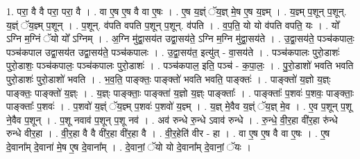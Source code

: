 \documentclass[17pt]{extarticle}
\begin{document}
1. परा॒ वै वै परा॒ परा॒ वै । . वा ए॒ष ए॒ष वै वा ए॒षः । . ए॒ष य॒ज्ञ्ं ॅय॒ज्ञ् मे॒ष ए॒ष य॒ज्ञ्म् । . य॒ज्ञ्म् प॒शून् प॒शून्. य॒ज्ञ्ं ॅय॒ज्ञ्म् प॒शून् । . प॒शून्. व॑पति वपति प॒शून् प॒शून्. व॑पति । . व॒प॒ति॒ यो यो व॑पति वपति॒ यः । . यो᳚ ऽग्नि म॒ग्निं ॅयो यो᳚ ऽग्निम् । . अ॒ग्नि मु॑द्वा॒सय॑त उद्वा॒सय॑ते॒ ऽग्नि म॒ग्नि मु॑द्वा॒सय॑ते । . उ॒द्वा॒सय॑ते॒ पञ्च॑कपालः॒ पञ्च॑कपाल उद्वा॒सय॑त उद्वा॒सय॑ते॒ पञ्च॑कपालः । . उ॒द्वा॒सय॑त॒ इत्यु॑त् - वा॒सय॑ते । . पञ्च॑कपालः पुरो॒डाशः॑ पुरो॒डाशः॒ पञ्च॑कपालः॒ पञ्च॑कपालः पुरो॒डाशः॑ । . पञ्च॑कपाल॒ इति॒ पञ्च॑ - क॒पा॒लः॒ । . पु॒रो॒डाशो॑ भवति भवति पुरो॒डाशः॑ पुरो॒डाशो॑ भवति । . भ॒व॒ति॒ पाङ्क्तः॒ पाङ्क्तो॑ भवति भवति॒ पाङ्क्तः॑ । . पाङ्क्तो॑ य॒ज्ञो य॒ज्ञ्ः पाङ्क्तः॒ पाङ्क्तो॑ य॒ज्ञ्ः । . य॒ज्ञ्ः पाङ्क्ताः॒ पाङ्क्ता॑ य॒ज्ञो य॒ज्ञ्ः पाङ्क्ताः᳚ । . पाङ्क्ताः᳚ प॒शवः॑ प॒शवः॒ पाङ्क्ताः॒ पाङ्क्ताः᳚ प॒शवः॑ । . प॒शवो॑ य॒ज्ञ्ं ॅय॒ज्ञ्म् प॒शवः॑ प॒शवो॑ य॒ज्ञ्म् । . य॒ज्ञ् मे॒वैव य॒ज्ञ्ं ॅय॒ज्ञ् मे॒व । . ए॒व प॒शून् प॒शू ने॒वैव प॒शून् । . प॒शू नवाव॑ प॒शून् प॒शू नव॑ । . अव॑ रुन्धे रु॒न्धे ऽवाव॑ रुन्धे । . रु॒न्धे॒ वी॒र॒हा वी॑र॒हा रु॑न्धे रुन्धे वीर॒हा । . वी॒र॒हा वै वै वी॑र॒हा वी॑र॒हा वै । . वी॒र॒हेति॑ वीर - हा । . वा ए॒ष ए॒ष वै वा ए॒षः । . ए॒ष दे॒वाना᳚म् दे॒वाना॑ मे॒ष ए॒ष दे॒वाना᳚म् । . दे॒वानां॒ ॅयो यो दे॒वाना᳚म् दे॒वानां॒ ॅयः । \newline
\end{document}
